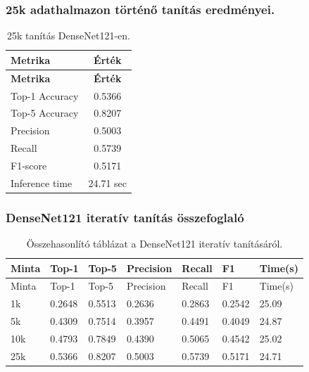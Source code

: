\subsubsection{25k adathalmazon történő tanítás eredményei.}
  \begin{center}
    \begin{longtable}{l c}
    \caption{25k tanítás DenseNet121-en.} \label{tab:phase03_DenseNet121_25k} \\
    \toprule
    \textbf{Metrika} & \textbf{Érték} \\
    \midrule
    \endfirsthead
    \toprule
    \textbf{Metrika} & \textbf{Érték} \\
    \midrule
    \endhead
    Top-1 Accuracy & 0.5366 \\
    Top-5 Accuracy & 0.8207 \\
    Precision      & 0.5003 \\
    Recall         & 0.5739 \\
    F1-score       & 0.5171 \\
    Inference time & 24.71 sec \\
    \bottomrule
    \end{longtable}
  \end{center}

\subsubsection{DenseNet121 iteratív tanítás összefoglaló}
  \begin{center}
    \begin{longtable}{lllllll}
    \caption{Összehasonlító táblázat a DenseNet121 iteratív tanításáról.}\label{tab:phase3_DenseNet121_summary_table}\\
    \toprule
    Minta & Top-1 & Top-5 & Precision & Recall & F1 & Time(s) \\
    \midrule
    \endfirsthead
    \toprule
    Minta & Top-1 & Top-5 & Precision & Recall & F1 & Time(s) \\
    \midrule
    \endhead
    1k & 0.2648 & 0.5513 & 0.2636 & 0.2863 & 0.2542 & 25.09 \\
    5k & 0.4309 & 0.7514 & 0.3957 & 0.4491 & 0.4049 & 24.87 \\
    10k & 0.4793 & 0.7849 & 0.4390 & 0.5065 & 0.4542 & 25.02 \\
    25k & 0.5366 & 0.8207 & 0.5003 & 0.5739 & 0.5171 & 24.71 \\
    \bottomrule
    \end{longtable}
  \end{center}
  
